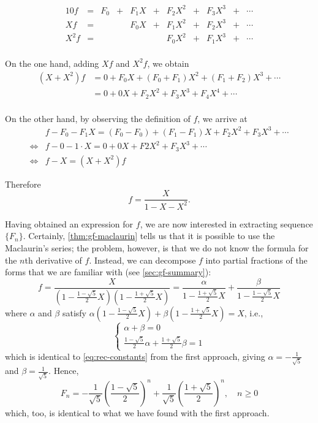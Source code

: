 \documentclass[a4paper, 12pt]{report}
\begin{document}
\begin{alignat*}{10}
f &= &F_0 &+ &F_1 X &+ &F_2 X^2 &+ &F_3 X^3 &+ &\cdots\\
X f &= & & &F_0 X &+ &F_1 X^2 &+ &F_2 X^3 &+ &\cdots\\
X^2 f &= & & & & &F_0 X^2 &+ &F_1 X^3 &+ &\cdots\\
\end{alignat*}

On the one hand, adding $X f$ and $X^2 f$, we obtain
\begin{align*}
    (X + X^2) f 
    &= 0 + F_0 X + (F_0 + F_1) X^2 + (F_1 + F_2) X^3 + \cdots\\
    &= 0 + 0 X + F_2 X^2 + F_3 X^3 + F_4 X^4 + \cdots\\
\end{align*}

On the other hand, by observing the definition of $f$, we arrive at
\begin{align*}
    &f - F_0 - F_1 X = (F_0 - F_0) + (F_1 - F_1)X + F_2 X^2 + F_3 X^3 + \cdots\\
    \iff &f - 0 - 1 \cdot X = 0 + 0X + F2 X^2 + F_3 X^3 + \cdots\\
    \iff &f - X = (X + X^2) f
\end{align*}

Therefore \[f = \frac{X}{1 - X - X^2}.\]

Having obtained an expression for $f$, we are now interested in extracting sequence $\{F_n\}$. Certainly, \cref{thm:gf-maclaurin} tells us that it is possible to use the Maclaurin's series; the problem, however, is that we do not know the formula for the $n$th derivative of $f$. Instead, we can decompose $f$ into partial fractions of the forms that we are familiar with (see \cref{sec:gf-summary}):
\[
    f
    = \frac{X}{
     (1 - \frac{1 - \sqrt{5}}{2} X)
     (1 - \frac{1 + \sqrt{5}}{2} X)
    }
    = \frac{\alpha}{1 - \frac{1 + \sqrt{5}}{2} X} + \frac{\beta}{1 - \frac{1 - \sqrt{5}}{2} X}
\]
where $\alpha$ and $\beta$ satisfy $\alpha(1 - \frac{1 - \sqrt{5}}{2}X) + \beta(1 - \frac{1 + \sqrt{5}}{2}X) = X$, i.e.,
\[
\begin{cases}
\alpha + \beta = 0\\
\frac{1 - \sqrt{5}}{2} \alpha + \frac{1 + \sqrt{5}}{2} \beta = 1
\end{cases}
\]
which is identical to \cref{eq:rec-constants} from the first approach, giving $\alpha = -\frac{1}{\sqrt{5}}$ and $\beta = \frac{1}{\sqrt{5}}$. Hence, 
\[
F_n = -\frac{1}{\sqrt{5}} \left(\frac{1 - \sqrt{5}}{2}\right)^n + \frac{1}{\sqrt{5}} \left(\frac{1 + \sqrt{5}}{2}\right)^n, \quad n \geq 0
\]
which, too, is identical to what we have found with the first approach. 
\end{document}
